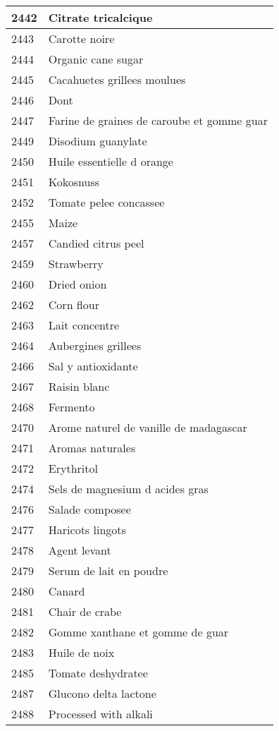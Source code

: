 \begin{longtable}{|l|l|}
2442 & Citrate tricalcique \\ \hline 
2443 & Carotte noire \\ \hline 
2444 & Organic cane sugar \\ \hline 
2445 & Cacahuetes grillees moulues \\ \hline 
2446 & Dont \\ \hline 
2447 & Farine de graines de caroube et gomme guar \\ \hline 
2449 & Disodium guanylate \\ \hline 
2450 & Huile essentielle d orange \\ \hline 
2451 & Kokosnuss \\ \hline 
2452 & Tomate pelee concassee \\ \hline 
2455 & Maize \\ \hline 
2457 & Candied citrus peel \\ \hline 
2459 & Strawberry \\ \hline 
2460 & Dried onion \\ \hline 
2462 & Corn flour \\ \hline 
2463 & Lait concentre \\ \hline 
2464 & Aubergines grillees \\ \hline 
2466 & Sal y antioxidante \\ \hline 
2467 & Raisin blanc \\ \hline 
2468 & Fermento \\ \hline 
2470 & Arome naturel de vanille de madagascar \\ \hline 
2471 & Aromas naturales \\ \hline 
2472 & Erythritol \\ \hline 
2474 & Sels de magnesium d acides gras \\ \hline 
2476 & Salade composee \\ \hline 
2477 & Haricots lingots \\ \hline 
2478 & Agent levant \\ \hline 
2479 & Serum de lait en poudre \\ \hline 
2480 & Canard \\ \hline 
2481 & Chair de crabe \\ \hline 
2482 & Gomme xanthane et gomme de guar \\ \hline 
2483 & Huile de noix \\ \hline 
2485 & Tomate deshydratee \\ \hline 
2487 & Glucono delta lactone \\ \hline 
2488 & Processed with alkali \\ \hline 

\end{longtable}
